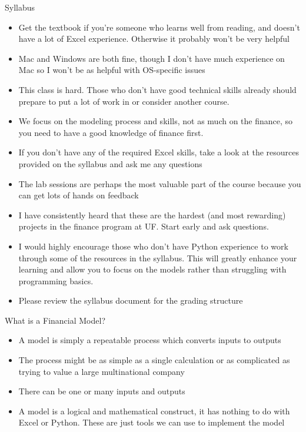 \documentclass[]{article}
\begin{document}
\begin{section}{Syllabus}
\begin{itemize}
\item Get the textbook if you're someone who learns well from reading, and doesn't have a lot of Excel experience. Otherwise it probably won't be very helpful
\item Mac and Windows are both fine, though I don't have much experience on Mac so I won't be as helpful with OS-specific issues
\item This class is hard. Those who don't have good technical skills already should prepare to put a lot of work in or consider another course.
\item We focus on the modeling process and skills, not as much on the finance, so you need to have a good knowledge of finance first.
\item If you don't have any of the required Excel skills, take a look at the resources provided on the syllabus and ask me any questions
\item The lab sessions are perhaps the most valuable part of the course because you can get lots of hands on feedback
\item I have consistently heard that these are the hardest (and most rewarding) projects in the finance program at UF. Start early and ask questions.
\item I would highly encourage those who don't have Python experience to work through some of the resources in the syllabus. This will greatly enhance your learning and allow you to focus on the models rather than struggling with programming basics.
\item Please review the syllabus document for the grading structure
\end{itemize}
\end{section}
\begin{section}{What is a Financial Model?}
\begin{itemize}
\item A model is simply a repeatable process which converts inputs to outputs
\item The process might be as simple as a single calculation or as complicated as trying to value a large multinational company
\item There can be one or many inputs and outputs
\item A model is a logical and mathematical construct, it has nothing to do with Excel or Python. These are just tools we can use to implement the model
\end{itemize}
\end{section}
\end{document}
